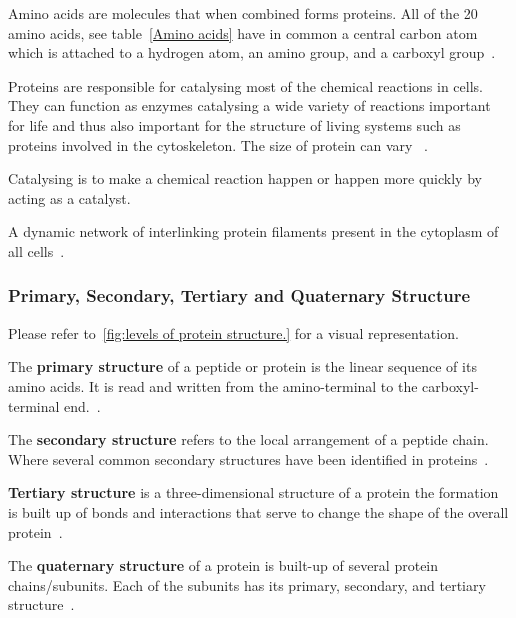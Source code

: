 \documentclass[]{final_report}
\begin{document}
Amino acids are molecules that when combined forms proteins. All of the 20 amino acids, see table~\ref{Amino acids} have in common a central carbon atom which is attached to a hydrogen atom, an amino group, and a carboxyl group~\cite{branden_introduction_1998}.

Proteins are responsible for catalysing most of the chemical reactions in cells. They can function as enzymes catalysing a wide variety of reactions important for life and thus also important for the structure of living systems such as proteins involved in the cytoskeleton. The size of protein can vary ~\cite{zvelebil_understanding_2008}.

\begin{definition}[Catalysing]
    Catalysing is to make a chemical reaction happen or happen more quickly by acting as a catalyst.
\end{definition}

\begin{definition}[Cytoskeleton]
    A dynamic network of interlinking protein filaments present in the cytoplasm of all cells~\cite{zvelebil_understanding_2008}. 
\end{definition}

\subsubsection{Primary, Secondary, Tertiary and Quaternary Structure}

Please refer to~\ref{fig:levels of protein structure.} for a visual representation.

The \textbf{primary structure} of a peptide or protein is the linear sequence of its amino acids. It is read and written from the amino-terminal to the carboxyl-terminal end.~\cite{sun_overview_2004}.

The \textbf{secondary structure} refers to the local arrangement of a peptide chain. Where several common secondary structures have been identified in proteins~\cite{sun_overview_2004}.

\textbf{Tertiary structure} is a three-dimensional structure of a protein the formation is built up of bonds and interactions that serve to change the shape of the overall protein~\cite{godbey_chapter_2022}.

The \textbf{quaternary structure} of a protein is built-up of several protein chains/subunits. Each of the subunits has its primary, secondary, and tertiary structure~\cite{ouellette_14_2015}.
\clearpage
\end{document}
